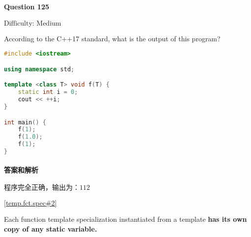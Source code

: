 \documentclass{article}
\begin{document}
	\paragraph*{Question 125} $\boxed{\text{Difficulty: Medium}} $			
	
	According to the C++17 standard, what is the output of this program?
	
	\begin{lstlisting}[language=C++]  		
#include <iostream>

using namespace std;

template <class T> void f(T) {
	static int i = 0;
	cout << ++i;
}

int main() {
	f(1);
	f(1.0);
	f(1);
}
	\end{lstlisting}
	
	\paragraph*{答案和解析} $\boxed{\text{程序完全正确，输出为：112}} $
	
	\href{https://timsong-cpp.github.io/cppwp/n4659/temp.fct.spec#2}{[temp.fct.spec\#2]}
	
	\begin{lightgrayleftbar}
		Each function template specialization instantiated from a template \textbf{has its own copy of any static variable.}
	\end{lightgrayleftbar}
	
\end{document}
